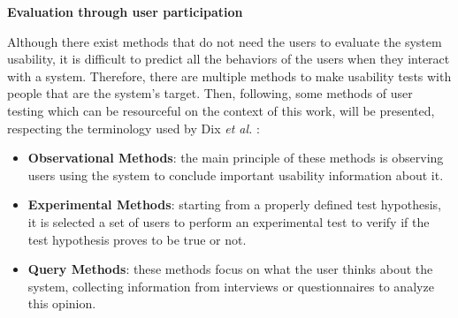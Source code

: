 \bigskip

\textbf{Evaluation through user participation}

Although there exist methods that do not need the users to evaluate the system usability, it is difficult to predict all the behaviors of the users when they interact with a system. Therefore, there are multiple methods to make usability tests with people that are the system's target. Then, following, some methods of user testing which can be resourceful on the context of this work, will be presented, respecting the terminology used by Dix \textit{et al.} \cite{humanComputerInteraction}:

\begin{itemize}
	\item \textbf{Observational Methods}: the main principle of these methods is observing users using the system to conclude important usability information about it. %
	\item \textbf{Experimental Methods}: starting from a properly defined test hypothesis, it is selected a set of users to perform an experimental test to verify if the test hypothesis proves to be true or not. %
	\item \textbf{Query Methods}: these methods focus on what the user thinks about the system, collecting information from interviews or questionnaires to analyze this opinion. %
\end{itemize}


